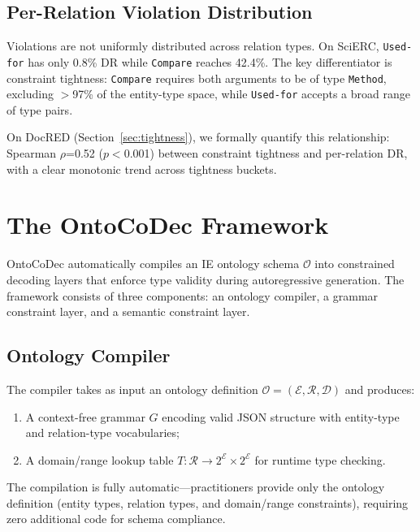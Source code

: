 \documentclass[11pt,a4paper]{article}
\newcommand{\sys}{OntoCoDec}
\begin{document}
\subsection{Per-Relation Violation Distribution}

Violations are not uniformly distributed across relation types.
On SciERC, \texttt{Used-for} has only 0.8\% DR while \texttt{Compare} reaches 42.4\%.
The key differentiator is constraint tightness: \texttt{Compare} requires both arguments to be of type \texttt{Method}, excluding $>$97\% of the entity-type space, while \texttt{Used-for} accepts a broad range of type pairs.

On DocRED (Section~\ref{sec:tightness}), we formally quantify this relationship: Spearman $\rho$=0.52 ($p<$0.001) between constraint tightness and per-relation DR, with a clear monotonic trend across tightness buckets.

\section{The \sys{} Framework}
\label{sec:method}

\sys{} automatically compiles an IE ontology schema $\mathcal{O}$ into constrained decoding layers that enforce type validity during autoregressive generation.
The framework consists of three components: an ontology compiler, a grammar constraint layer, and a semantic constraint layer.

\subsection{Ontology Compiler}

The compiler takes as input an ontology definition $\mathcal{O} = (\mathcal{E}, \mathcal{R}, \mathcal{D})$ and produces:
\begin{enumerate}
    \item A context-free grammar $G$ encoding valid JSON structure with entity-type and relation-type vocabularies;
    \item A domain/range lookup table $T: \mathcal{R} \to 2^{\mathcal{E}} \times 2^{\mathcal{E}}$ for runtime type checking.
\end{enumerate}
The compilation is fully automatic---practitioners provide only the ontology definition (entity types, relation types, and domain/range constraints), requiring zero additional code for schema compliance.
\end{document}
